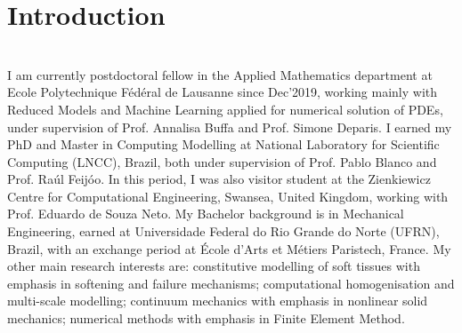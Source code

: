 \documentclass[11pt,letterpaper]{twentysecondcv} %
\begin{document}
\section{Introduction} \\
I am currently postdoctoral fellow in the Applied Mathematics department at Ecole Polytechnique Fédéral de Lausanne since Dec'2019, working mainly with Reduced Models and Machine Learning applied for numerical solution of PDEs, under supervision of Prof. Annalisa Buffa and Prof. Simone Deparis. I earned my PhD and Master in Computing Modelling at National Laboratory for Scientific Computing (LNCC), Brazil, both under supervision of Prof. Pablo Blanco and Prof. Raúl Feijóo. In this period, I was also visitor student at the Zienkiewicz Centre for Computational Engineering, Swansea, United Kingdom, working with Prof. Eduardo de Souza Neto. My Bachelor background is in Mechanical Engineering, earned at Universidade Federal do Rio Grande do Norte (UFRN), Brazil, with an exchange period at École d'Arts et Métiers Paristech, France. My other main research interests are: constitutive modelling of soft tissues with emphasis in softening and failure mechanisms; computational homogenisation and multi-scale modelling; continuum mechanics with emphasis in nonlinear solid mechanics; numerical methods with emphasis in Finite Element Method.


\end{document}
